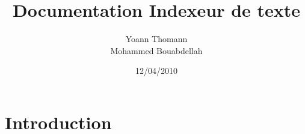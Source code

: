 \documentclass[french, 12pt, titlepage]{article}
\author{Yoann Thomann\\Mohammed Bouabdellah}
\date{12/04/2010}
\title{Documentation Indexeur de texte}
\begin{document}
\vspace{\fill}
\maketitle
\newpage
\tableofcontents
\newpage
\section{Introduction}
\end{document}
